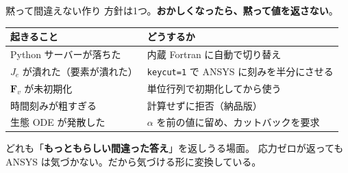 \documentclass[aspectratio=169,11pt]{beamer}
\begin{document}
\begin{frame}{黙って間違えない作り}
\small 方針は1つ。\textbf{おかしくなったら、黙って値を返さない}。
\vspace{5pt}
\begin{center}\small
\begin{tabular}{@{}ll@{}}
\toprule
起きること & どうするか \\
\midrule
Python サーバーが落ちた & 内蔵 Fortran に自動で切り替え \\
$J_e$ が潰れた（要素が潰れた） & \texttt{keycut=1} で ANSYS に刻みを半分にさせる \\
$\bm{F}_v$ が未初期化 & 単位行列で初期化してから使う \\
時間刻みが粗すぎる & 計算せずに拒否（納品版） \\
生態 ODE が発散した & $\alpha$ を前の値に留め、カットバックを要求 \\
\bottomrule
\end{tabular}
\end{center}
\vspace{6pt}
\small どれも「\textbf{もっともらしい間違った答え}」を返しうる場面。
応力ゼロが返っても ANSYS は気づかない。だから気づける形に変換している。
\end{frame}
\end{document}
